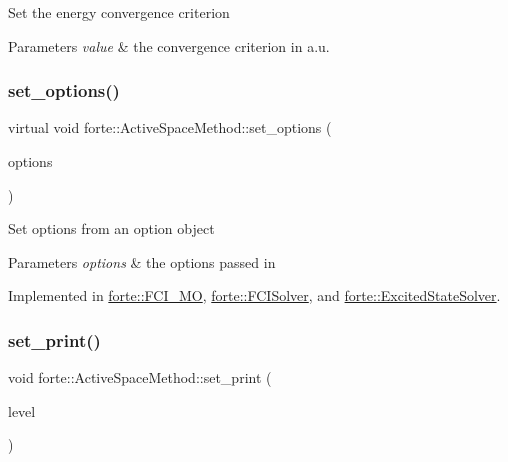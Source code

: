 Set the energy convergence criterion 
\begin{DoxyParams}{Parameters}
{\em value} & the convergence criterion in a.\+u. \\
\hline
\end{DoxyParams}
\mbox{\label{classforte_1_1_active_space_method_a9416a627f550d4d56f6b8ffe7478ed89}} 
\subsubsection{\texorpdfstring{set\+\_\+options()}{set\_options()}}
{\footnotesize\ttfamily virtual void forte\+::\+Active\+Space\+Method\+::set\+\_\+options (\begin{DoxyParamCaption}\item[{std\+::shared\+\_\+ptr$<$ \mbox{\hyperlink{classforte_1_1_forte_options}{Forte\+Options}} $>$}]{options }\end{DoxyParamCaption})\hspace{0.3cm}{\ttfamily [pure virtual]}}

Set options from an option object 
\begin{DoxyParams}{Parameters}
{\em options} & the options passed in \\
\hline
\end{DoxyParams}


Implemented in \mbox{\hyperlink{classforte_1_1_f_c_i___m_o_ad03e24facf8d8b4ba766ce7a0e5725e6}{forte\+::\+F\+C\+I\+\_\+\+MO}}, \mbox{\hyperlink{classforte_1_1_f_c_i_solver_a5bb962ea913122dbcec9319411876b05}{forte\+::\+F\+C\+I\+Solver}}, and \mbox{\hyperlink{classforte_1_1_excited_state_solver_ac32716228ebaa1dfda75cf48db544e5f}{forte\+::\+Excited\+State\+Solver}}.

\mbox{\label{classforte_1_1_active_space_method_a4442ac4afcec13630ff4e539a321205a}} 
\subsubsection{\texorpdfstring{set\+\_\+print()}{set\_print()}}
{\footnotesize\ttfamily void forte\+::\+Active\+Space\+Method\+::set\+\_\+print (\begin{DoxyParamCaption}\item[{int}]{level }\end{DoxyParamCaption})}

